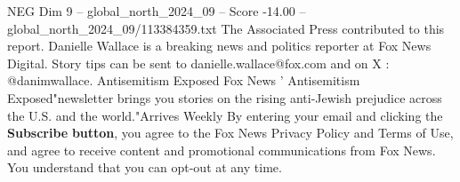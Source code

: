 \begin{textsample}{NEG Dim 9 – global\_north\_2024\_09 – Score -14.00 – global\_north\_2024\_09/113384359.txt}
The Associated Press contributed to this report.
Danielle Wallace is a breaking news and politics reporter at Fox News Digital.
Story tips can be sent to danielle.wallace@fox.com and on X : @danimwallace.
Antisemitism Exposed Fox News ' Antisemitism Exposed"newsletter brings you stories on the rising anti-Jewish prejudice across the U.S. and the world."Arrives Weekly By entering your email and clicking the \textbf{Subscribe} \textbf{button}, you agree to the Fox News Privacy Policy and Terms of Use, and agree to receive content and promotional communications from Fox News.
You understand that you can opt-out at any time.

\end{textsample}
